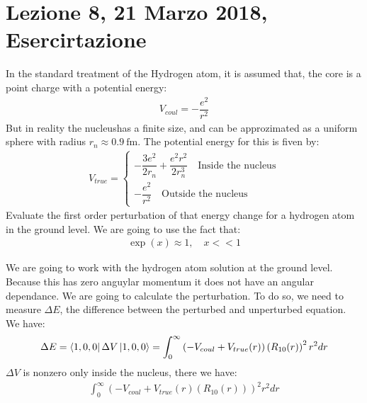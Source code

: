 \documentclass[../AppuntiStruttura]{subfiles}
\begin{document}
	\section*{Lezione 8, 21 Marzo 2018, Esercirtazione}
	\begin{exe}[8 aprile 2014]
		In the standard treatment of the Hydrogen atom, it is assumed that, the core is a point charge with a potential energy:
		\begin{gather}
		V_{coul}=-\dfrac{e^{2}}{r^{2}}
		\end{gather}
		But in reality the nucleushas a finite size, and can be approzimated as a uniform sphere with radius $ r_{n}\approx\SI{0.9}{\femto\meter} $. The potential energy for this is fiven by:
		\begin{gather}
		V_{true}=\begin{cases}
		-\dfrac{3e^{2}}{2r_{n}}+\dfrac{e^{2}r^{2}}{2r_{n}^{3}}\quad \text{Inside the nucleus}\\
		-\dfrac{e^{2}}{r^{2}}\quad\text{Outside the nucleus}
		\end{cases}
		\end{gather}
		Evaluate the first order perturbation of that energy change for a hydrogen atom in the ground level. We are going to use the fact that:
		\begin{gather}
		\exp(x)\approx 1,\quad x<<1
		\end{gather}
	\end{exe}
	\begin{sol}
		We are going to work with the hydrogen atom solution at the ground level. Because this has zero anguylar momentum it does not have an angular dependance. We are going to calculate the perturbation. To do so, we need to measure $ \Delta E $, the difference between the perturbed and unperturbed equation. We have:
		\begin{gather}
		\Delta E = \bra{1,0,0}\Delta V\ket{1,0,0}=\int_{0}^{\infty}\left(-V_{coul}+V_{true}(r)\right)\left(R_{10}(r)\right)^{2}r^{2}dr
		\end{gather}
		$ \Delta V $ is nonzero only inside the nucleus, there we have:
		\begin{gather}
			\int_{0}^{\infty}\left(-V_{coul}+V_{true}(r)\left(R_{10}(r)\right)\right)^{2}r^{2}dr
		\end{gather}
	\end{sol}
 
\end{document}
